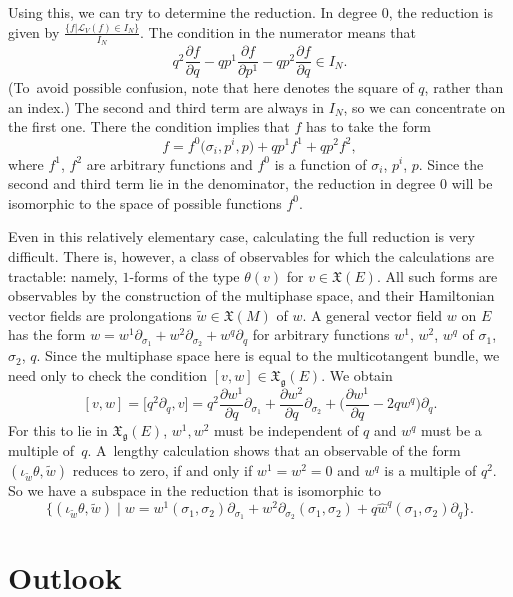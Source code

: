 \documentclass[pdftex]{sigma}
\numberwithin{equation}{section}
\newcommand{\g}{\mathfrak{g}}
\renewcommand{\L}{\mathscr{L}}
\newcommand{\X}{\mathfrak{X}}
\begin{document}
Using this, we can try to determine the reduction.
In degree $0$, the reduction is given by $\frac{\{f|\L_V(f)\in I_N\}}{I_N}$. The condition in the numerator means that
\[
q^2\frac{\partial f}{\partial q}-qp^1\frac{\partial f}{\partial p^1}-qp^2\frac{\partial f}{\partial q} \in I_N.
\] \big(To~avoid possible confusion, note that here  denotes the square of $q$, rather than an index.\big) The second and third term are always in $I_N$, so we can concentrate on the first one. There the condition implies that $f$ has to take the form
\[
	f=f^0\bigl(\sigma_i,p^i,p\bigr)+ qp^1f^1+ qp^2f^2,
\]
where $f^1$, $f^2$ are arbitrary functions and $f^0$ is a function of $\sigma_i$, $p^i$, $p$. Since the second and third term lie in the denominator, the reduction in degree $0$ will be isomorphic to the space of possible functions $f^0$.

Even in this relatively elementary case, calculating the full reduction is very difficult. There is, however, a class of observables for which the calculations are tractable: namely, $1$-forms of the type $\theta(v)$ for $v\in \mathfrak X(E)$. All such forms are observables by the construction of the multiphase space, and their Hamiltonian vector fields are prolongations $\tilde w\in \mathfrak X(M)$ of $w$. A general vector field $w$ on $E$ has the form $w=w^1\partial_{\sigma_1}+w^2\partial_{\sigma_2}+w^q\partial_{q} $
for arbitrary functions $w^1$, $w^2$, $w^q$ of $\sigma_1$, $\sigma_2$, $q$.
Since the multiphase space here is equal to the multicotangent bundle, we need only to check the condition $[v,w ]\in \X_\g(E)$. We obtain
\[
	[v,w]=\bigl[q^2\partial_q,v\bigr]=q^2\frac{\partial w^1}{\partial q}\partial_{\sigma_1}+\frac{\partial w^2}{\partial q}\partial_{\sigma_2}+\biggl(\frac{\partial w^1}{\partial q}-2qw^q\biggr)\partial_{q} .
\]
For this to lie in $\X_\g(E)$, $w^1,w^2$ must be independent of $q$ and $w^q$ must be a multiple of~$q$. A~lengthy calculation shows that an observable of the form $(\iota_{\tilde w}\theta, \tilde w)$ reduces to zero, if and only if $w^1=w^2=0$ and $w^q$ is a multiple of $q^2$. So we have a subspace in the reduction that is isomorphic to
\[
\bigl\{(\iota_{\tilde w}\theta, \tilde w)\mid w=w^1(\sigma_1,\sigma_2)\partial_{\sigma_1}+w^2\partial_{\sigma_2}(\sigma_1,\sigma_2)+q\hat w^q(\sigma_1,\sigma_2)\partial_{q}
\bigr\}.
\]

\section{Outlook}\label{Sec:Outlook}
\end{document}
